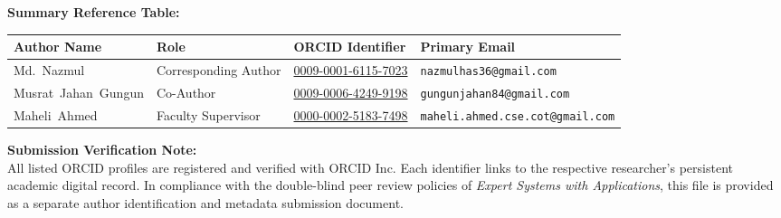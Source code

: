 \documentclass[a4paper,10pt]{article}
\begin{document}
\vspace{1.0ex}
\noindent\textbf{Summary Reference Table:}\\[0.5ex]
\noindent
\small
\begin{tabularx}{\textwidth}{@{}p{3.2cm} p{2.8cm} p{3.8cm} X@{}}
\toprule
\textbf{Author Name} & \textbf{Role} & \textbf{ORCID Identifier} & \textbf{Primary Email} \\
\midrule
Md.~Nazmul & Corresponding Author & \href{https://orcid.org/0009-0001-6115-7023}{0009-0001-6115-7023} & {\footnotesize\texttt{nazmulhas36@gmail.com}} \\
Musrat~Jahan~Gungun & Co-Author & \href{https://orcid.org/0009-0006-4249-9198}{0009-0006-4249-9198} & {\footnotesize\texttt{gungunjahan84@gmail.com}} \\
Maheli~Ahmed & Faculty Supervisor & \href{https://orcid.org/0000-0002-5183-7498}{0000-0002-5183-7498} & {\footnotesize\texttt{maheli.ahmed.cse.cot@gmail.com}} \\
\bottomrule
\end{tabularx}
\normalsize

\vspace{1.5ex}
\noindent\textbf{Submission Verification Note:} \\
All listed ORCID profiles are registered and verified with ORCID Inc. Each identifier links to the respective researcher's persistent academic digital record. In compliance with the double-blind peer review policies of \textit{Expert Systems with Applications}, this file is provided as a separate author identification and metadata submission document.
\end{document}
